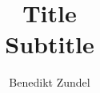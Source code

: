 \documentclass{article}
\title{\Huge{Title}\\Subtitle}
\author{\huge{Benedikt Zundel}}
\date{}
\begin{document}
\maketitle

\newpage

\tableofcontents

\pagebreak

% 
\end{document}
